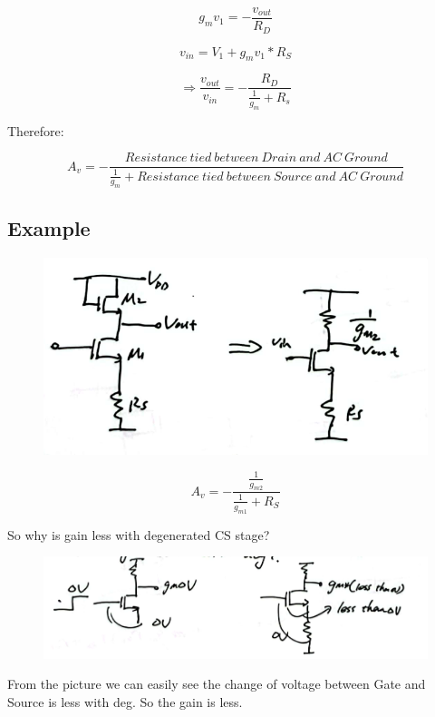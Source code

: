 \documentclass[fontset=windows]{article}
\begin{document}
$$g_mv_1=-\frac{v_{out}}{R_D}$$

$$v_{in}=V_1+g_mv_1*R_S$$

$$\Longrightarrow\frac{v_{out}}{v_{in}}=-\frac{R_D}{\frac{1}{g_m}+R_s}$$

Therefore: 

$$A_v=-\frac{Resistance \ tied \ between \ Drain \ and \ AC \ Ground}{\frac{1}{g_m}+Resistance \ tied \ between \ Source \ and \ AC \ Ground}$$

\subsection*{Example}

\begin{figure}[htbp]
    \centering
    \includegraphics[scale=0.8]{3.jpg}
    \captionsetup{labelformat=empty}
    \caption{}
    \label{3}
\end{figure}

$$A_v=-\frac{\frac{1}{g_{m2}}}{\frac{1}{g_{m1}}+R_S}$$

So why is gain less with degenerated CS stage? 

\begin{figure}[htbp]
    \centering
    \includegraphics[scale=0.8]{4.jpg}
    \captionsetup{labelformat=empty}
    \caption{}
    \label{4}
\end{figure}

From the picture we can easily see the change of voltage between Gate and Source is less with deg. 
So the gain is less. 
\end{document}
